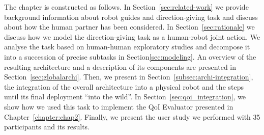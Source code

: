 \documentclass[a4paper,11pt,twoside]{StyleThese}
\begin{document}
The chapter is constructed as follows. In Section~\ref{sec:related-work} we provide background information about robot guides and direction-giving task and discuss about how the human partner has been considered. In Section~\ref{sec:rationale} we discuss how we model the direction-giving task as a human-robot joint action. We analyse the task based on human-human exploratory studies and decompose it into a succession of precise subtasks in Section\ref{sec:modeling}. An overview of the resulting architecture and a description of its components are presented in Section~\ref{sec:globalarchi}. Then, we present in Section~\ref{subsec:archi-integration}, the integration of the overall architecture into a physical robot and the steps until its final deployment ``into the wild''. In Section~\ref{sec:qoi_integration}, we show how we used this task to implement the QoI Evaluator presented in Chapter~\ref{chapter:chap2}. Finally, we present the user study we performed with 35 participants and its results.
\end{document}
